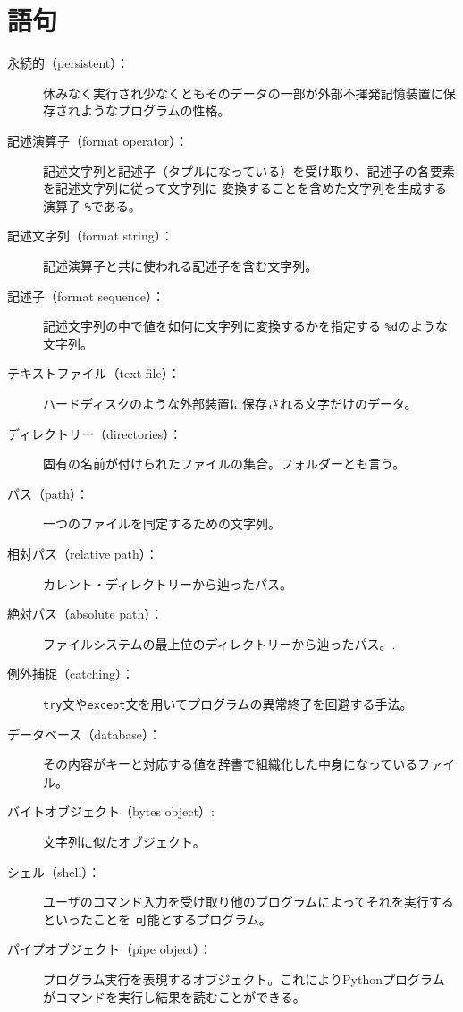 \documentclass[a4j,12pt,makeidx]{jbook}
\begin{document}
\section{語句}
\begin{description}

\item[永続的（persistent）：] 休みなく実行され少なくともそのデータの一部が外部不揮発記憶装置に保存されようなプログラムの性格。

\item[記述演算子（format operator）：] 記述文字列と記述子（タプルになっている）を受け取り、記述子の各要素を記述文字列に従って文字列に
変換することを含めた文字列を生成する演算子 {\tt \%}である。

\item[記述文字列（format string）：] 記述演算子と共に使われる記述子を含む文字列。 

\item[記述子（format sequence）：] 記述文字列の中で値を如何に文字列に変換するかを指定する {\tt \%d}のような文字列。

\item[テキストファイル（text file）：] ハードディスクのような外部装置に保存される文字だけのデータ。

\item[ディレクトリー（directories）：] 固有の名前が付けられたファイルの集合。フォルダーとも言う。

\item[パス（path）：] 一つのファイルを同定するための文字列。

\item[相対パス（relative path）：] カレント・ディレクトリーから辿ったパス。

\item[絶対パス（absolute path）：] ファイルシステムの最上位のディレクトリーから辿ったパス。.

\item[例外捕捉（catching）：] {\tt try}文や{\tt except}文を用いてプログラムの異常終了を回避する手法。

\item[データベース（database）：] その内容がキーと対応する値を辞書で組織化した中身になっているファイル。

\item[バイトオブジェクト（bytes object）:] 文字列に似たオブジェクト。
 
\item[シェル（shell）：] ユーザのコマンド入力を受け取り他のプログラムによってそれを実行するといったことを
可能とするプログラム。

\item[パイプオブジェクト（pipe object）：] プログラム実行を表現するオブジェクト。これによりPythonプログラム
がコマンドを実行し結果を読むことができる。

\end{description}
%
\end{document}
